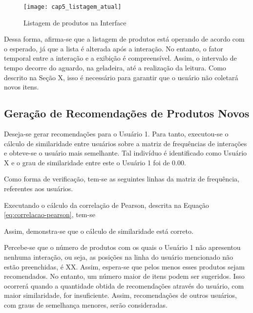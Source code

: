 \begin{figure}
    \caption{Listagem de produtos na Interface}
    \label{fig:cap5_listagem_atual}
    \texttt{[image: cap5\_listagem\_atual]}
\end{figure}
 
 
 Dessa forma, afirma-se que a listagem de produtos está operando de acordo com o esperado, já que a lista é alterada após a interação. No entanto, o fator temporal entre a interação e a exibição é compreensível. Assim, o intervalo de tempo decorre do aguardo, na geladeira, até a realização da leitura. Como descrito na Seção X, isso é necessário para garantir que o usuário não coletará novos itens.

\subsection{Geração de Recomendações de Produtos Novos}


Deseja-se gerar recomendações para o Usuário 1. Para tanto, executou-se o cálculo de similaridade entre usuários sobre a matriz de frequências de interações e obteve-se o usuário mais semelhante. Tal indivíduo é identificado como Usuário X e o grau de similaridade entre este o Usuário 1 foi de 0.00.


Como forma de verificação, tem-se as seguintes linhas da matriz de frequência, referentes aos usuários.


Executando o cálculo da correlação de Pearson, descrita na Equação \ref{eq:correlacao-pearson}, tem-se


Assim, demonstra-se que o cálculo de similaridade está correto.

Percebe-se que o número de produtos com os quais o Usuário 1 não apresentou nenhuma interação, ou seja, as posições na linha do usuário mencionado não estão preenchidas, é XX. Assim, espera-se que pelos menos esses produtos sejam recomendados. 
No entanto, um número maior de itens podem ser sugeridos. Isso ocorrerá quando a quantidade obtida de recomendações através do usuário, com maior similaridade, for insuficiente. Assim, recomendações de outros usuários, com graus de semelhança menores, serão consideradas.

